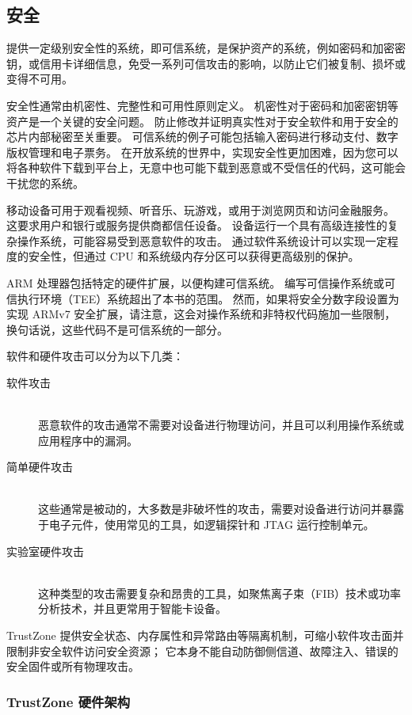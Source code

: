 \subsection{安全}

提供一定级别安全性的系统，即可信系统，是保护资产的系统，例如密码和加密密钥，或信用卡详细信息，免受一系列可信攻击的影响，以防止它们被复制、损坏或变得不可用。

安全性通常由机密性、完整性和可用性原则定义。
机密性对于密码和加密密钥等资产是一个关键的安全问题。
防止修改并证明真实性对于安全软件和用于安全的芯片内部秘密至关重要。
可信系统的例子可能包括输入密码进行移动支付、数字版权管理和电子票务。
在开放系统的世界中，实现安全性更加困难，因为您可以将各种软件下载到平台上，无意中也可能下载到恶意或不受信任的代码，这可能会干扰您的系统。

移动设备可用于观看视频、听音乐、玩游戏，或用于浏览网页和访问金融服务。
这要求用户和银行或服务提供商都信任设备。
设备运行一个具有高级连接性的复杂操作系统，可能容易受到恶意软件的攻击。
通过软件系统设计可以实现一定程度的安全性，但通过 CPU 和系统级内存分区可以获得更高级别的保护。

ARM 处理器包括特定的硬件扩展，以便构建可信系统。
编写可信操作系统或可信执行环境（TEE）系统超出了本书的范围。
然而，如果将安全分数字段设置为实现 ARMv7 安全扩展，请注意，这会对操作系统和非特权代码施加一些限制，换句话说，这些代码不是可信系统的一部分。

软件和硬件攻击可以分为以下几类：

\begin{description}
  \item[软件攻击] \hfill \\
    恶意软件的攻击通常不需要对设备进行物理访问，并且可以利用操作系统或应用程序中的漏洞。
  \item[简单硬件攻击] \hfill \\
    这些通常是被动的，大多数是非破坏性的攻击，需要对设备进行访问并暴露于电子元件，使用常见的工具，如逻辑探针和 JTAG 运行控制单元。
  \item[实验室硬件攻击] \hfill \\
    这种类型的攻击需要复杂和昂贵的工具，如聚焦离子束（FIB）技术或功率分析技术，并且更常用于智能卡设备。
\end{description}

TrustZone 提供安全状态、内存属性和异常路由等隔离机制，可缩小软件攻击面并限制非安全软件访问安全资源；
它本身不能自动防御侧信道、故障注入、错误的安全固件或所有物理攻击。

\subsubsection{TrustZone 硬件架构}

